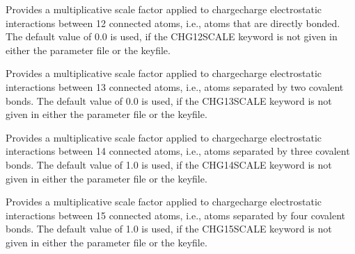 \documentclass[letterpaper,11pt,english]{sphinxmanual}
\begin{document}
\ignorespaces {}\label{\detokenize{text/keywords:key-chg-12-scale}}\begin{description}
\sphinxAtStartPar
Provides a multiplicative scale factor applied to charge\sphinxhyphen{}charge electrostatic interactions between 1\sphinxhyphen{}2 connected atoms, i.e., atoms that are directly bonded. The default value of 0.0 is used, if the CHG\sphinxhyphen{}12\sphinxhyphen{}SCALE keyword is not given in either the parameter file or the keyfile.

\end{description}

\ignorespaces {}\label{\detokenize{text/keywords:key-chg-13-scale}}\begin{description}
\sphinxAtStartPar
Provides a multiplicative scale factor applied to charge\sphinxhyphen{}charge electrostatic interactions between 1\sphinxhyphen{}3 connected atoms, i.e., atoms separated by two covalent bonds. The default value of 0.0 is used, if the CHG\sphinxhyphen{}13\sphinxhyphen{}SCALE keyword is not given in either the parameter file or the keyfile.

\end{description}

\ignorespaces {}\label{\detokenize{text/keywords:key-chg-14-scale}}\begin{description}
\sphinxAtStartPar
Provides a multiplicative scale factor applied to charge\sphinxhyphen{}charge electrostatic interactions between 1\sphinxhyphen{}4 connected atoms, i.e., atoms separated by three covalent bonds. The default value of 1.0 is used, if the CHG\sphinxhyphen{}14\sphinxhyphen{}SCALE keyword is not given in either the parameter file or the keyfile.

\end{description}

\ignorespaces {}\label{\detokenize{text/keywords:key-chg-15-scale}}\begin{description}
\sphinxAtStartPar
Provides a multiplicative scale factor applied to charge\sphinxhyphen{}charge electrostatic interactions between 1\sphinxhyphen{}5 connected atoms, i.e., atoms separated by four covalent bonds. The default value of 1.0 is used, if the CHG\sphinxhyphen{}15\sphinxhyphen{}SCALE keyword is not given in either the parameter file or the keyfile.

\end{description}
\end{document}
